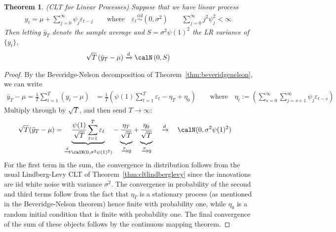 \documentclass[12pt]{article}
\theoremstyle{plain}
\newtheorem{thm}{Theorem}[section]
\theoremstyle{definition}
\theoremstyle{remark}
\newcommand{\ra}{\rightarrow}
\newcommand{\iid}{\overset{iid}{\sim}}
\newcommand{\pto}{\xrightarrow{p}}
\newcommand{\dto}{\xrightarrow{d}}
\newcommand{\sumtT}{\sum^T_{t=1}}
\begin{document}
\begin{thm}
\label{thm:cltlinear}
\emph{(CLT for Linear Processes)}
Suppose that we have linear process
\begin{align*}
  y_t=\mu+\sum_{j=0}^\infty \psi_j \varepsilon_{t-j}
  \qquad\text{where}\quad
  \varepsilon_t\iid (0,\sigma^2)
  \qquad
  \sum_{j=0}^\infty j^2\psi_j^2<\infty
\end{align*}
Then letting $\bar{y}_T$ denote the sample average and
$S=\sigma^2\psi(1)^2$ the LR variance of $\{y_t\}$,
\begin{align*}
  \sqrt{T}\left(
  \bar{y}_T
  - \mu
  \right)
  \dto \calN\left(0,S\right)
\end{align*}
\end{thm}
\begin{proof}
By the Beveridge-Nelson decomposition of
Theorem~\ref{thm:beveridgenelson}, we can write
\begin{align*}
  \bar{y}_T-\mu
  =
  \frac{1}{T}\sumtT (y_t-\mu)
  &=
  \frac{1}{T}
  \left(
  \psi(1)
  \sumtT \varepsilon_t
  -
  \eta_T
  +
  \eta_0
  \right)
  \qquad \text{where}\quad
  \eta_t
  :=
  \left(
  \sum_{s=0}^\infty
  \sum_{j=s+1}^\infty \psi_j\varepsilon_{t-s}
  \right)
\end{align*}
Multiply through by $\sqrt{T}$, and then send $T\ra\infty$:
\begin{align*}
  \sqrt{T}(\bar{y}_T-\mu)
  &=
  \underbrace{%
    \frac{\psi(1)}{\sqrt{T}}
    \sumtT \varepsilon_t
  }_{\dto \calN(0,\sigma^2\psi(1)^2)}
  -
  \underbrace{%
    \frac{\eta_T}{\sqrt{T}}
    \vphantom{%
      \frac{\psi(1)}{\sqrt{T}}
      \sumtT \varepsilon_t
    }
  }_{\pto 0}
  +
  \underbrace{%
    \frac{\eta_0}{\sqrt{T}}
    \vphantom{%
      \frac{\psi(1)}{\sqrt{T}}
      \sumtT \varepsilon_t
    }
  }_{\pto 0}
  \quad
  \dto
  \quad
  \calN(0,\sigma^2\psi(1)^2)
\end{align*}
For the first term in the sum, the convergence in distribution follows
from the usual Lindberg-Levy CLT of Theorem~\ref{thm:cltlindberglevy}
since the innovations are iid white noise with variance $\sigma^2$.
The convergence in probability of the second and third terms follow from
the fact that $\eta_T$ is a stationary process (as mentioned in the
Beveridge-Nelson theorem) hence finite with probability one, while
$\eta_0$ is a random initial condition that is finite with probability
one.
The final convergence of the sum of these objects follows by the
continuous mapping theorem.
\end{proof}
\end{document}
